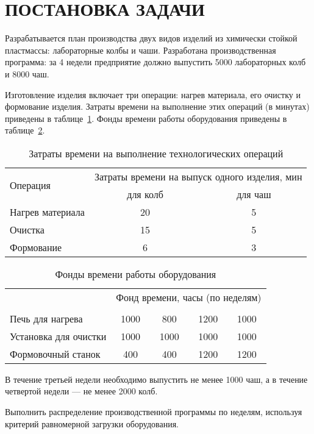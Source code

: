 \section{ПОСТАНОВКА ЗАДАЧИ}

Разрабатывается план производства двух видов изделий из химически
стойкой пластмассы: лабораторные колбы и чаши.
Разработана производственная программа: за 4 недели предприятие
должно выпустить 5000 лабораторных колб и 8000 чаш.

Изготовление изделия включает три операции:
нагрев материала, его очистку и формование изделия.
Затраты времени на выполнение этих операций (в минутах)
приведены в таблице~\ref{tbl:timers}. 
Фонды времени работы оборудования приведены в таблице~\ref{tbl:time_available}.

\begin{table} [h!]
  \caption{Затраты времени на выполнение технологических операций}
  \label{tbl:timers}
  \begin{tabular}{| m{4.9cm} | c | c |}
    
    \hline
    \multirow{2}{*}{Операция} & \multicolumn{2}{c|}{Затраты времени на выпуск одного изделия, мин} \\

    \cline{2-3} & \parbox{5cm}{\centering для колб} & \parbox{5cm}{\centering для чаш} \\ \hline

    Нагрев материала & 20 & 5 \\ \hline

    Очистка & 15 & 5 \\ \hline

    Формование & 6 & 3 \\ \hline
      
  \end{tabular}
\end{table}

\vspace{-4mm}

\begin{table} [h!]
  \caption{
    Фонды времени работы оборудования
  }\label{tbl:time_available}
  \begin{tabular}{| m{5.8cm} | c | c | c | c |}
    \hline
    \multirow{2}{*}{}
    & \multicolumn{4}{c|}{Фонд времени, часы (по неделям)} 
    \\ \cline{2-5}

    & \parbox{2.1cm}{}
    & \parbox{2.1cm}{}
    & \parbox{2.1cm}{}
    & \parbox{2.1cm}{} \\
    \hline

    Печь для нагрева        & 1000 & 800 & 1200 & 1000 \\ \hline

    Установка для очистки   & 1000 & 1000 & 1000 & 1000 \\ \hline

    Формовочный станок      & 400 & 400 & 1200 & 1200 \\ \hline      

  \end{tabular}
\end{table}

В течение третьей недели необходимо выпустить не менее 1000 чаш,
а в течение четвертой недели --- не менее 2000 колб.

Выполнить распределение производственной программы по неделям,
используя критерий равномерной загрузки оборудования.